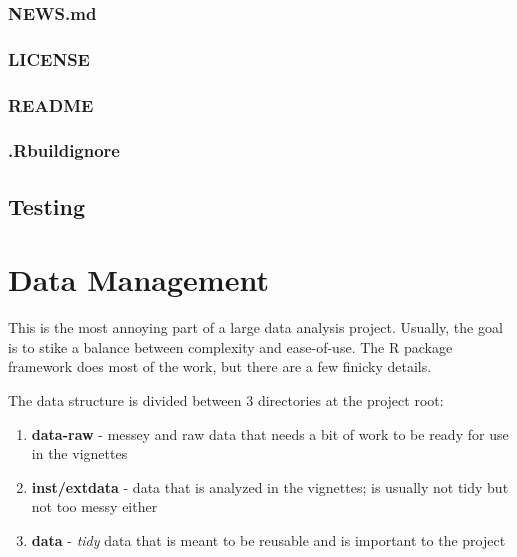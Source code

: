 \documentclass[]{book}
\providecommand{\tightlist}{%
  \setlength{\itemsep}{0pt}\setlength{\parskip}{0pt}}
\begin{document}
\hypertarget{news.md}{%
\subsection{NEWS.md}\label{news.md}}

\hypertarget{license-1}{%
\subsection{LICENSE}\label{license-1}}

\hypertarget{readme}{%
\subsection{README}\label{readme}}

\hypertarget{rbuildignore}{%
\subsection{.Rbuildignore}\label{rbuildignore}}

\hypertarget{testing}{%
\section{Testing}\label{testing}}

\hypertarget{data-management}{%
\chapter{Data Management}\label{data-management}}

This is the most annoying part of a large data analysis project. Usually, the goal is to stike a balance between complexity and ease-of-use. The R package framework does most of the work, but there are a few finicky details.

The data structure is divided between 3 directories at the project root:

\begin{enumerate}
\def\labelenumi{\arabic{enumi}.}
\tightlist
\item
  \textbf{data-raw} - messey and raw data that needs a bit of work to be ready for use in the vignettes
\item
  \textbf{inst/extdata} - data that is analyzed in the vignettes; is usually not tidy but not too messy either
\item
  \textbf{data} - \emph{tidy} data that is meant to be reusable and is important to the project
\end{enumerate}
\end{document}
